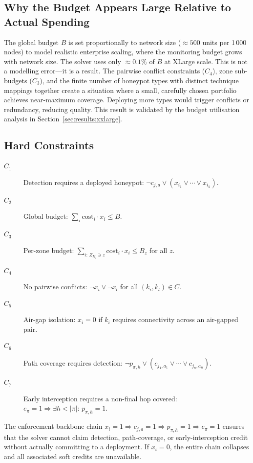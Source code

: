 \documentclass[journal]{IEEEtran}
\begin{document}
\subsection{Why the Budget Appears Large Relative to Actual Spending}
\label{sec:model:budget}

The global budget $B$ is set proportionally to network size
($\approx500$ units per 1\,000 nodes) to model realistic enterprise
scaling, where the monitoring budget grows with network size. The
solver uses only $\approx0.1\%$ of $B$ at XLarge scale. This is
not a modelling error---it is a result. The pairwise conflict
constraints ($C_4$), zone sub-budgets ($C_3$), and the finite
number of honeypot types with distinct technique mappings together
create a situation where a small, carefully chosen portfolio achieves
near-maximum coverage. Deploying more types would trigger conflicts
or redundancy, reducing quality. This result is validated by the
budget utilisation analysis in Section~\ref{sec:results:xxlarge}.

\subsection{Hard Constraints}
\label{sec:model:hard}

\begin{description}
  \item[$C_1$] Detection requires a deployed honeypot:
    $\neg c_{j,a}\vee(x_{i_1}\vee\cdots\vee x_{i_k})$.
  \item[$C_2$] Global budget:
    $\sum_i\mathrm{cost}_i\cdot x_i\leq B$.
  \item[$C_3$] Per-zone budget:
    $\sum_{i:\,Z_{K_i}\ni z}\mathrm{cost}_i\cdot x_i\leq B_z$
    for all $z$.
  \item[$C_4$] No pairwise conflicts:
    $\neg x_i\vee\neg x_l$ for all $(k_i,k_l)\in C$.
  \item[$C_5$] Air-gap isolation:
    $x_i=0$ if $k_i$ requires connectivity across an air-gapped pair.
  \item[$C_6$] Path coverage requires detection:
    $\neg p_{\pi,h}\vee(c_{j_1,a_1}\vee\cdots\vee c_{j_n,a_n})$.
  \item[$C_7$] Early interception requires a non-final hop covered:
    $e_\pi=1\Rightarrow\exists h<|\pi|:\,p_{\pi,h}=1$.
\end{description}

The enforcement backbone chain $x_i=1\Rightarrow c_{j,a}=1
\Rightarrow p_{\pi,h}=1\Rightarrow e_\pi=1$ ensures that the solver
cannot claim detection, path-coverage, or early-interception credit
without actually committing to a deployment. If $x_i=0$, the entire
chain collapses and all associated soft credits are unavailable.
\end{document}
